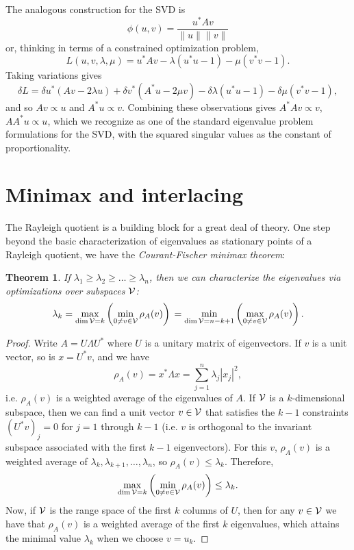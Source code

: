 \documentclass[12pt, leqno]{article} %
\newtheorem{theorem}{Theorem}
\begin{document}
The analogous construction for the SVD is
\[
  \phi(u,v) = \frac{u^* A v}{\|u\| \|v\|}
\]
or, thinking in terms of a constrained optimization problem, 
\[
  L(u,v,\lambda,\mu) = u^* A v - \lambda (u^* u - 1) - \mu (v^* v-1).
\]
Taking variations gives
\[
  \delta L =
  \delta u^* (Av - 2\lambda u) + \delta v^* (A^* u-2\mu v) - \delta \lambda (u^*u - 1) - \delta \mu (v^* v - 1),
\]
and so $Av \propto u$ and $A^* u \propto v$.  Combining these observations
gives $A^* A v \propto v$, $A A^* u \propto u$, which we recognize as one
of the standard eigenvalue problem formulations for the SVD, with the squared
singular values as the constant of proportionality.

\section{Minimax and interlacing}

The Rayleigh quotient is a building block for a great deal of theory.
One step beyond the basic characterization of eigenvalues as stationary
points of a Rayleigh quotient, we have
the {\em Courant-Fischer minimax theorem}:
\begin{theorem}
  If $\lambda_1 \geq \lambda_2 \geq \ldots \geq \lambda_n$, then
  we can characterize the eigenvalues via optimizations over
  subspaces $\mathcal{V}$:
  \[
    \lambda_k
      = \max_{\dim \mathcal{V} = k} \left( \min_{0 \neq v \in \mathcal{V}} \rho_A(v) \right) \\
      = \min_{\dim \mathcal{V} = n-k+1} \left( \max_{0 \neq v \in \mathcal{V}} \rho_A(v) \right).
  \]
\end{theorem}

\begin{proof}
  Write $A = U \Lambda U^*$ where $U$ is a unitary matrix of eigenvectors.
  If $v$ is a unit vector, so is $x = U^* v$, and we have
  \[
    \rho_A(v) = x^* \Lambda x = \sum_{j=1}^n \lambda_j |x_j|^2,
  \]
  i.e. $\rho_A(v)$ is a weighted average of the eigenvalues
  of $A$.  If $\mathcal{V}$ is a $k$-dimensional subspace, then we can find
  a unit vector $v \in \mathcal{V}$ that satisfies the $k-1$ constraints
  $(U^* v)_j = 0$ for $j = 1$ through $k-1$ (i.e. $v$ is orthogonal to
  the invariant subspace associated with the first $k-1$
  eigenvectors).  For this $v$, $\rho_A(v)$ is a weighted average of
  $\lambda_k, \lambda_{k+1}, \ldots, \lambda_n$, so $\rho_A(v) \leq
  \lambda_k$.  Therefore,
  \[
      \max_{\dim \mathcal{V} = k} \left( \min_{0 \neq v \in \mathcal{V}} \rho_A(v) \right)
      \leq \lambda_k.
  \]
  Now, if $\mathcal{V}$ is the range space of the first $k$ columns of $U$,
  then for any $v \in \mathcal{V}$ we have that $\rho_A(v)$ is a weighted
  average of the first $k$ eigenvalues, which attains the minimal value
  $\lambda_k$ when we choose $v = u_k$.
\end{proof}
\end{document}
